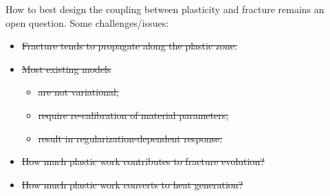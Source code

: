 \begin{frame}
\end{frame}

\begin{frame}
  \begin{columns}[T]
    \begin{column}{0.7\textwidth}
      \vspace{3em}
      How to best design the coupling between plasticity and fracture remains an open question. Some challenges/issues:
      \begin{itemize}
        \item \sout<2->{Fracture tends to propagate along the plastic zone.}
        \item \sout<7->{Most existing models}
              \begin{itemize}
                \item \sout<3->{are not variational,}
                \item \sout<5->{require re-calibration of material parameters,}
                \item \sout<7->{result in regularization-dependent response.}
              \end{itemize}
        \item \sout<8->{How much plastic work contributes to fracture evolution?}
        \item \sout<8->{How much plastic work converts to heat generation?}
      \end{itemize}
    \end{column}
    \begin{column}{0.3\textwidth}
      \vspace{-1.5em}
      \only<4>{
        
      }
    \end{column}
  \end{columns}
\end{frame}


